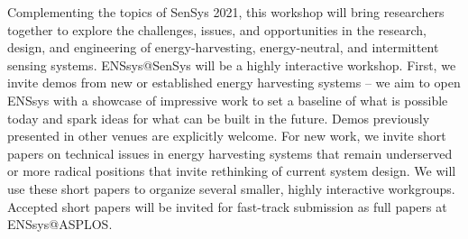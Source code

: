 \documentclass[a4paper,10pt]{scrartcl}
\begin{document}
\renewcommand{\baselinestretch}{1.05} 



\vspace{-7.5em}

\vspace{-1em}
Complementing the topics of SenSys 2021, this workshop will bring researchers
together to explore the challenges, issues, and opportunities in the research,
design, and engineering of energy-harvesting, energy-neutral, and intermittent
sensing systems.
%
%
%
%
ENSsys@SenSys will be a highly interactive workshop.
%
First, we invite demos from new or established energy
harvesting systems -- we aim to open ENSsys with a showcase of impressive work
to set a baseline of what is possible today and spark ideas for what can be
built in the future.
%
Demos previously presented in other venues are explicitly welcome.
%
For new work, we invite short papers on technical issues in energy harvesting
systems that remain underserved or more radical positions that invite rethinking of
current system design.
%
We will use these short papers to organize several smaller, highly interactive
workgroups.
%
Accepted short papers will be invited for fast-track submission as full papers at ENSsys@ASPLOS.
\end{document}
